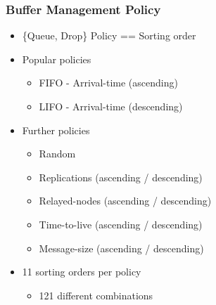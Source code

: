 \begin{frame}
  \frametitle{Buffer Management Policy}
  \begin{itemize}
    \item \{Queue, Drop\} Policy == Sorting order
    \vspace{0.3cm}
    \item Popular policies
    \begin{itemize}
      \item FIFO - Arrival-time (ascending)
      \item LIFO - Arrival-time (descending)
    \end{itemize}
    \vspace{0.3cm}
    \item Further policies
    \begin{itemize}
      \item Random
      \item Replications (ascending / descending)
      \item Relayed-nodes (ascending / descending)
      \item Time-to-live (ascending / descending)
      \item Message-size (ascending / descending)
    \end{itemize}
    \vspace{0.3cm}
    \item 11 sorting orders per policy
    \begin{itemize}
      \item 121 different combinations
    \end{itemize}
  \end{itemize}
\end{frame}
